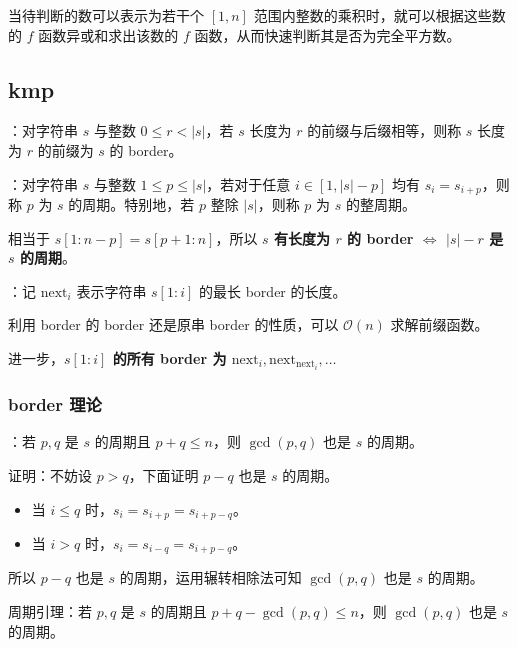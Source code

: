 当待判断的数可以表示为若干个 $[1, n]$ 范围内整数的乘积时，就可以根据这些数的 $f$ 函数异或和求出该数的 $f$ 函数，从而快速判断其是否为完全平方数。

\subsection{kmp}

：对字符串 $s$ 与整数 $0 \leq r < |s|$，若 $s$ 长度为 $r$ 的前缀与后缀相等，则称 $s$ 长度为 $r$ 的前缀为 $s$ 的 border。

：对字符串 $s$ 与整数 $1 \leq p \leq |s|$，若对于任意 $i \in [1, |s| - p]$ 均有 $s_i = s_{i + p}$，则称 $p$ 为 $s$ 的周期。特别地，若 $p$ 整除 $|s|$，则称 $p$ 为 $s$ 的整周期。

相当于 $s[1 : n - p] = s[p + 1 : n]$，所以 \textbf{$s$ 有长度为 $r$ 的 border $\iff$ $|s| - r$ 是 $s$ 的周期}。

：记 $\mathrm{next}_i$ 表示字符串 $s[1 : i]$ 的最长 border 的长度。

利用 border 的 border 还是原串 border 的性质，可以 $\mathcal{O}(n)$ 求解前缀函数。

进一步，\textbf{$s[1 : i]$ 的所有 border 为 $\mathrm{next}_i, \mathrm{next}_{\mathrm{next}_i}, \dots$}


\subsubsection{border 理论}

：若 $p, q$ 是 $s$ 的周期且 $p + q \leq n$，则 $\gcd(p, q)$ 也是 $s$ 的周期。

证明：不妨设 $p > q$，下面证明 $p - q$ 也是 $s$ 的周期。

\begin{itemize}
    \item 当 $i \leq q$ 时，$s_i = s_{i + p} = s_{i + p - q}$。
    \item 当 $i > q$ 时，$s_i = s_{i - q} = s_{i + p - q}$。
\end{itemize}

所以 $p - q$ 也是 $s$ 的周期，运用辗转相除法可知 $\gcd(p, q)$ 也是 $s$ 的周期。

\begin{quoteblock}
周期引理：若 $p, q$ 是 $s$ 的周期且 $p + q - \gcd(p, q) \leq n$，则 $\gcd(p, q)$ 也是 $s$ 的周期。
\end{quoteblock}

